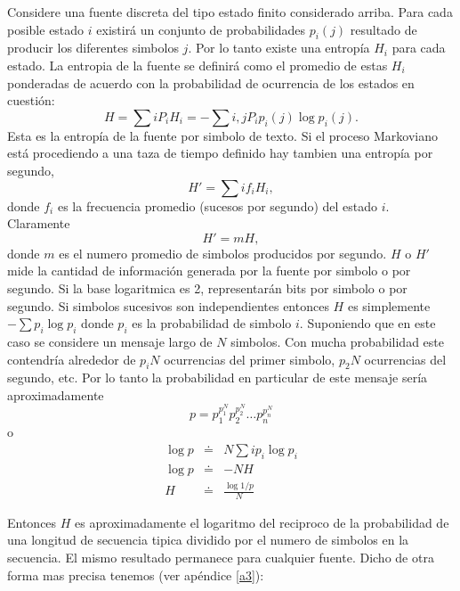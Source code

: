 Considere una fuente discreta del tipo estado finito considerado
arriba. Para cada posible estado $i$ existir\'{a} un conjunto de
probabilidades $p_{i}(j)$ resultado de producir los diferentes simbolos
$j$. Por lo tanto existe una entrop\'{i}a $H_{i}$ para cada estado. La
entropia de la fuente se definir\'{a} como el promedio de estas
$H_{i}$ ponderadas de acuerdo con la probabilidad de ocurrencia de los
estados en cuesti\'{o}n:
\begin{equation}
H = \sum{i} P_{i}H_{i}
  = - \sum{i,j} P_{i}p_{i}(j) \log p_{i}(j).
\end{equation}
Esta es la entrop\'{i}a de la fuente por simbolo de texto. Si el
proceso Markoviano est\'{a} procediendo a una taza de tiempo definido
hay tambien una entrop\'{i}a por segundo,
\begin{equation}
H' = \sum{i} f_{i}H_{i},
\end{equation}
donde $f_{i}$ es la frecuencia promedio (sucesos por segundo) del estado $i$. Claramente
\begin{equation}
H' = mH,
\end{equation}
donde $m$ es el numero promedio de simbolos producidos por
segundo. $H$ o $H'$ mide la cantidad de informaci\'{o}n generada por
la fuente por simbolo o por segundo. Si la base logaritmica es 2,
representar\'{a}n bits por simbolo o por segundo.  Si simbolos
sucesivos son independientes entonces $H$ es simplemente $-\sum p_{i}
\log p_{i}$ donde $p_{i}$ es la probabilidad de simbolo
$i$. Suponiendo que en este caso se considere un mensaje largo de $N$
simbolos. Con mucha probabilidad este contendr\'{i}a alrededor de
$p_{i}N$ ocurrencias del primer simbolo, $p_{2}N$ ocurrencias del
segundo, etc. Por lo tanto la probabilidad en particular de este
mensaje ser\'{i}a aproximadamente
\begin{equation}
p = p_{1}^{ p_{1}^{N}} p_{2}^{ p_{2}^{N}} \ldots p_{n}^{ p_{n}^{N}}
\end{equation}
o
\begin{equation}
\begin{array}{rcl}
\log p &\doteq& N \sum{i} p_{i} \log p_{i} \\
\log p &\doteq& -NH \\
H &\doteq& \frac{\log 1/p}{N}
\end{array}
\end{equation}

Entonces $H$ es aproximadamente el logaritmo del reciproco de la
probabilidad de una longitud de secuencia tipica dividido por el
numero de simbolos en la secuencia. El mismo resultado permanece para
cualquier fuente. Dicho de otra forma mas precisa tenemos (ver
ap\'{e}ndice \ref{a3}): 

